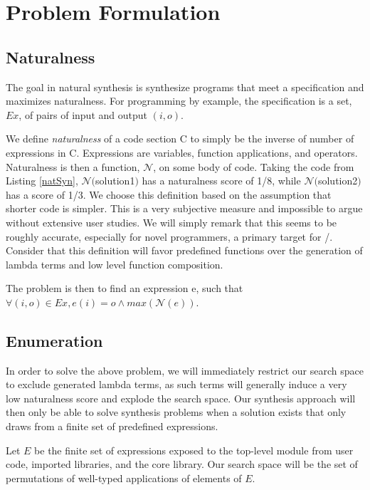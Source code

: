 \section{Problem Formulation}
\label{problem}

\subsection{Naturalness}

The goal in natural synthesis is synthesize programs that meet a specification and maximizes naturalness.
For programming by example, the specification is a set, $Ex$, of pairs of input and output $(i,o)$.

We define \textit{naturalness} of a code section C to simply be the inverse of number of expressions in C.
Expressions are variables, function applications, and operators.
Naturalness is then a function, $\mathcal{N}$, on some body of code.
Taking the code from Listing \ref{natSyn}, $\mathcal{N}($solution1$)$ has a naturalness score of 1/8, while $\mathcal{N}($solution2$)$ has a score of 1/3.
We choose this definition based on the assumption that shorter code is simpler.
This is a very subjective measure and impossible to argue without extensive user studies.
We will simply remark that this seems to be roughly accurate, especially for novel programmers, a primary target for \ourTool/.
Consider that this definition will favor predefined functions over the generation of lambda terms and low level function composition.

The problem is then to find an expression e, such that $\forall (i,o) \in Ex, e (i) = o \land max(\mathcal{N}(e))$.


\subsection{Enumeration}
In order to solve the above problem, we will immediately restrict our search space to exclude generated lambda terms, as such terms will generally induce a very low naturalness score and explode the search space.
Our synthesis approach will then only be able to solve synthesis problems when a solution exists that only draws from a finite set of predefined expressions.

Let $E$ be the finite set of expressions exposed to the top-level module from user code, imported libraries, and the core library.
Our search space will be the set of permutations of well-typed applications of elements of $E$.

